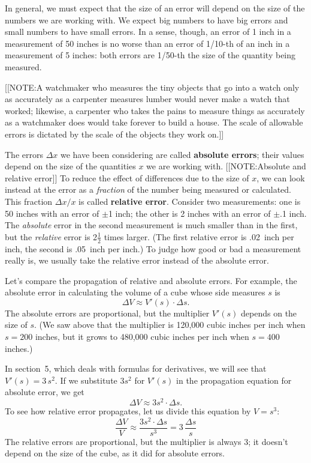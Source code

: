 In general, we must expect that the size of an error will depend on
the size of the numbers we are working with.  We expect big numbers to
have big errors and small numbers to have small errors.  In a sense,
though, an error of 1 inch in a measurement of 50 inches is no worse
than an error of 1/10-th of an inch in a measurement of 5 inches: both
errors are 1/50-th the size of the quantity being measured.

[[NOTE:A watchmaker who measures the tiny objects that go into a watch
  only as accurately as a carpenter measures lumber would never make a
  watch that worked; likewise, a carpenter who takes the pains to
  measure things as accurately as a watchmaker does would take forever
  to build a house.  The scale of allowable errors is dictated by the
  scale of the objects they work on.]]

The errors $\Delta x$ we have been considering are called {\bf
  absolute errors}; their
values depend on the size of the quantities $x$ we are working with.
[[NOTE:Absolute and  relative error]]
To reduce the effect of differences due to the size of $x$, we can
look instead at the error as a {\em fraction\/} of the number being
measured or calculated.  This fraction $\Delta x/x$ is called {\bf
  relative error}.
Consider two measurements: one is 50 inches with an error of $\pm$1
inch; the other is 2 inches with an error of $\pm$.1 inch.  The {\em
  absolute\/} error in the second measurement is much smaller than in
the first, but the {\em relative\/} error is 2$\tfrac{1}{2}$ times
larger.  (The first relative error is .02~inch per inch, the second is
.05~inch per inch.)  To judge how good or bad a measurement really is,
we usually take the relative error instead of the absolute error.

Let's compare the propagation of relative and absolute errors.  For
example, the absolute error in calculating the volume of a cube whose
side measures $s$ is
\[
\Delta V \approx V'(s) \cdot \Delta s.
\]
The absolute errors are proportional, but the multiplier $V'(s)$
depends on the size of $s$.  (We saw above that the multiplier is
120,000 cubic inches per inch when $s = 200$ inches, but it grows to
480,000 cubic inches per inch when $s = 400$ inches.)

In section~5, which deals with formulas for derivatives, we will see
that $V'(s) = 3\,s^2$.  If we substitute $3s^2$ for $V'(s)$ in the
propagation equation for absolute error, we get
\[
\Delta V \approx 3s^2 \cdot \Delta s.
\]
To see how relative error propagates, let us divide this equation
by $V = s^3$:
\[
\dfrac{\Delta V}{V} \approx 
		\dfrac{3s^2 \cdot \Delta s}{s^3} =
		3 \, \dfrac{\Delta s}{s}
\]	
The relative errors are proportional, but the multiplier is always 3;
it doesn't depend on the size of the cube, as it did for absolute
errors.

